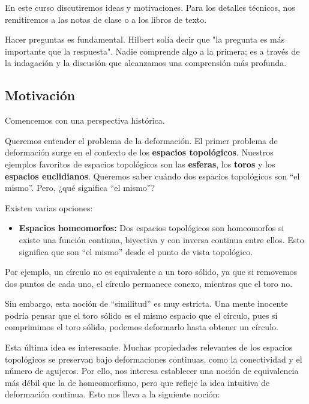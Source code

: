 

En este curso discutiremos ideas y motivaciones. Para los detalles técnicos, nos remitiremos a las notas de clase o a los libros de texto.

Hacer preguntas es fundamental. Hilbert solía decir que "la pregunta es más importante que la respuesta". Nadie comprende algo a la primera; es a través de la indagación y la discusión que alcanzamos una comprensión más profunda.

\subsection{Motivación}

Comencemos con una perspectiva histórica.

Queremos entender el problema de la deformación. El primer problema de deformación surge en el contexto de los \textbf{espacios topológicos}. Nuestros ejemplos favoritos de espacios topológicos son las \textbf{esferas}, los \textbf{toros} y los \textbf{espacios euclidianos}. Queremos saber cuándo dos espacios topológicos son ``el mismo''. Pero, ¿qué significa ``el mismo''?

Existen varias opciones:

\begin{itemize}
    \item \textbf{Espacios homeomorfos:} Dos espacios topológicos son homeomorfos si existe una función continua, biyectiva y con inversa continua entre ellos. Esto significa que son ``el mismo'' desde el punto de vista topológico.
\end{itemize}

Por ejemplo, un círculo no es equivalente a un toro sólido, ya que si removemos dos puntos de cada uno, el círculo permanece conexo, mientras que el toro no.

Sin embargo, esta noción de ``similitud'' es muy estricta. Una mente inocente podría pensar que el toro sólido es el mismo espacio que el círculo, pues si comprimimos el toro sólido, podemos deformarlo hasta obtener un círculo.

Esta última idea es interesante. Muchas propiedades relevantes de los espacios topológicos se preservan bajo deformaciones continuas, como la conectividad y el número de agujeros. Por ello, nos interesa establecer una noción de equivalencia más débil que la de homeomorfismo, pero que refleje la idea intuitiva de deformación continua. Esto nos lleva a la siguiente noción:


